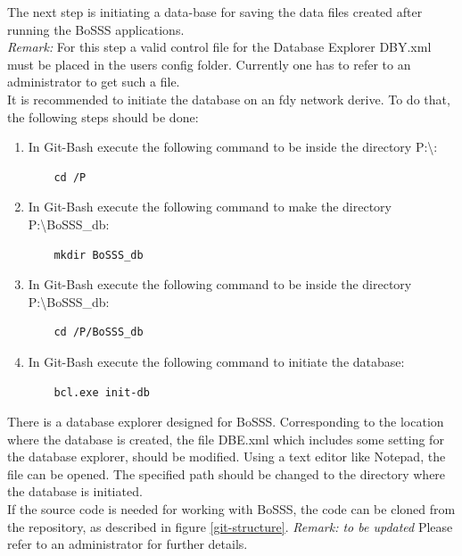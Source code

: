 \documentclass[11pt,twoside,a4paper]{fdyartcl}
\begin{document}
The next step is initiating a data-base for saving the data files created after running the BoSSS applications. \\
\emph{Remark:} For this step a valid control file for the Database Explorer {\scriptsize DBY.xml} must be placed in the users config folder. Currently one has to refer to an administrator to get such a file.\\
It is recommended to initiate the database on an fdy network derive. To do that, the following steps should be done:
\begin{enumerate}
\item In Git-Bash execute the following command to be inside the directory {\scriptsize P:\textbackslash}:
    {\scriptsize \begin{verbatim}
    cd /P
    \end{verbatim}}
\item In Git-Bash execute the following command to make the directory {\scriptsize P:\textbackslash BoSSS\_db}:
    {\scriptsize \begin{verbatim}
    mkdir BoSSS_db
    \end{verbatim}}
\item In Git-Bash execute the following command to be inside the directory {\scriptsize P:\textbackslash BoSSS\_db}:
    {\scriptsize \begin{verbatim}
    cd /P/BoSSS_db
    \end{verbatim}}
\item In Git-Bash execute the following command to initiate the database:
    {\scriptsize \begin{verbatim}
    bcl.exe init-db
    \end{verbatim}}
\end{enumerate}
There is a database explorer designed for BoSSS. Corresponding to the location where the database is created, the file {\scriptsize DBE.xml} which includes some setting for the database explorer, should be modified.
Using a text editor like Notepad, the file can be opened. The specified path should be changed to the directory where the database is initiated.\\
If the source code is needed for working with BoSSS, the code can be cloned from the repository, as described in figure \ref{git-structure}.
\emph{Remark: to be updated} Please refer to an administrator for further details.
\end{document}
